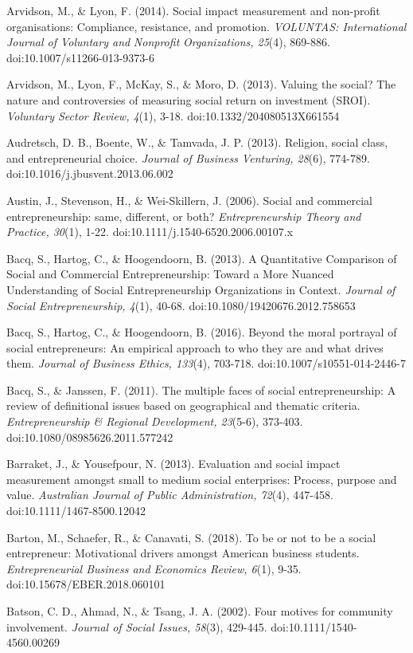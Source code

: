 \documentclass{article}
\begin{document}
Arvidson, M., \& Lyon, F. (2014). Social impact measurement and non-profit organisations: Compliance, resistance, and promotion. \emph{VOLUNTAS: International Journal of Voluntary and }\emph{Nonprofit}\emph{ Organizations, 25}(4), 869-886. doi:10.1007/s11266-013-9373-6

Arvidson, M., Lyon, F., McKay, S., \& Moro, D. (2013). Valuing the social? The nature and controversies of measuring social return on investment (SROI). \emph{Voluntary Sector Review, 4}(1), 3-18. doi:10.1332/204080513X661554

Audretsch, D. B., Boente, W., \& Tamvada, J. P. (2013). Religion, social class, and entrepreneurial choice. \emph{Journal of Business Venturing, 28}(6), 774-789. doi:10.1016/j.jbusvent.2013.06.002

Austin, J., Stevenson, H., \& Wei-Skillern, J. (2006). Social and commercial entrepreneurship: same, different, or both? \emph{Entrepreneurship Theory and Practice, 30}(1), 1-22. doi:10.1111/j.1540-6520.2006.00107.x

Bacq, S., Hartog, C., \& Hoogendoorn, B. (2013). A Quantitative Comparison of Social and Commercial Entrepreneurship: Toward a More Nuanced Understanding of Social Entrepreneurship Organizations in Context. \emph{Journal of Social Entrepreneurship, 4}(1), 40-68. doi:10.1080/19420676.2012.758653

Bacq, S., Hartog, C., \& Hoogendoorn, B. (2016). Beyond the moral portrayal of social entrepreneurs: An empirical approach to who they are and what drives them. \emph{Journal of Business Ethics, 133}(4), 703-718. doi:10.1007/s10551-014-2446-7

Bacq, S., \& Janssen, F. (2011). The multiple faces of social entrepreneurship: A review of definitional issues based on geographical and thematic criteria. \emph{Entrepreneurship \& Regional Development, 23}(5-6), 373-403. doi:10.1080/08985626.2011.577242

Barraket, J., \& Yousefpour, N. (2013). Evaluation and social impact measurement amongst small to medium social enterprises: Process, purpose and value. \emph{Australian Journal of Public Administration, 72}(4), 447-458. doi:10.1111/1467-8500.12042

Barton, M., Schaefer, R., \& Canavati, S. (2018). To be or not to be a social entrepreneur: Motivational drivers amongst American business students. \emph{Entrepreneurial Business and Economics Review, 6}(1), 9-35. doi:10.15678/EBER.2018.060101

Batson, C. D., Ahmad, N., \& Tsang, J. A. (2002). Four motives for community involvement. \emph{Journal of Social Issues, 58}(3), 429-445. doi:10.1111/1540-4560.00269
\end{document}
